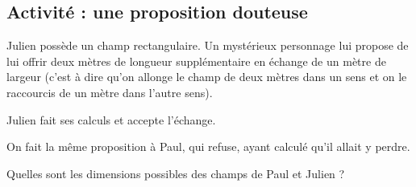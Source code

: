 
\subsection*{Activité : une proposition douteuse}

Julien possède un champ rectangulaire. Un mystérieux personnage lui propose de lui offrir deux mètres de longueur supplémentaire en échange de un mètre de largeur (c'est à dire qu'on allonge le champ de deux mètres dans un sens et on le raccourcis de un mètre dans l'autre sens).

Julien fait ses calculs et accepte l'échange.

On fait la même proposition à Paul, qui refuse, ayant calculé qu'il allait y perdre.

Quelles sont les dimensions possibles des champs de Paul et Julien ?

